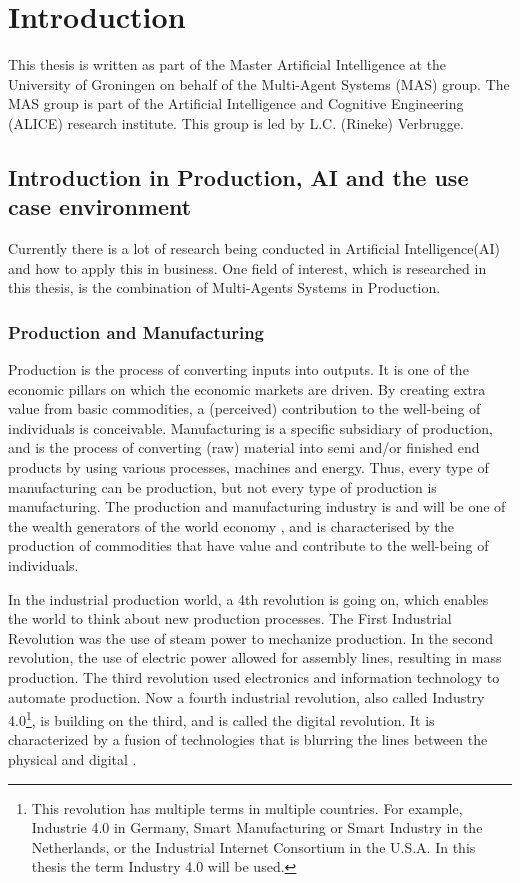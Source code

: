 \chapter{Introduction}
\label{ch:intro}
This thesis is written as part of the Master Artificial Intelligence at the University of Groningen on behalf of the Multi-Agent Systems (MAS) group. The MAS group is part of the Artificial Intelligence and Cognitive Engineering (ALICE) research institute. This group is led by L.C. (Rineke) Verbrugge.  

\section{Introduction in Production, AI and the use case environment}

Currently there is a lot of research being conducted in Artificial Intelligence(AI) and how to apply this in business. One field of interest, which is researched in this thesis, is the combination of Multi-Agents Systems in Production.

\subsection{Production and Manufacturing}
Production is the process of converting inputs into outputs. It is one of the economic pillars on which the economic markets are driven. By creating extra value from basic commodities, a (perceived) contribution to the well-being of individuals is conceivable. Manufacturing is a specific subsidiary of production, and is the process of converting (raw) material into semi and/or finished end products by using various processes, machines and energy. Thus, every type of manufacturing can be production, but not every type of production is manufacturing. The production and manufacturing industry is and will be one of the wealth generators of the world economy \citep{monostori2006agent}, and is characterised by the production of commodities that have value and contribute to the well-being of individuals.

In the industrial production world, a 4th revolution is going on, which enables the world to think about new production processes. The First Industrial Revolution was the use of steam power to mechanize production. In the second revolution, the use of electric power allowed for assembly lines, resulting in mass production. The third revolution used electronics and information technology to automate production. Now a fourth industrial revolution, also called Industry 4.0\footnote{This revolution has multiple terms in multiple countries. For example, Industrie 4.0 in Germany, Smart Manufacturing or Smart Industry in the Netherlands, or the Industrial Internet Consortium in the U.S.A. In this thesis the term Industry 4.0 will be used.}, is building on the third, and is called the digital revolution. It is characterized by a fusion of technologies that is blurring the lines between the physical and digital \citep{leitao2016smart}.

